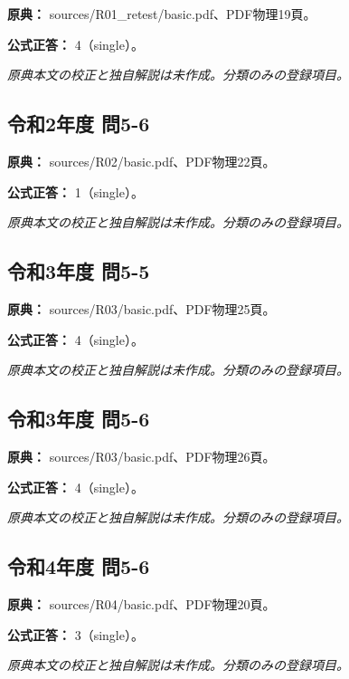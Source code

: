 \noindent\textbf{原典：} sources/R01\_retest/basic.pdf、PDF物理19頁。

\textbf{公式正答：} 4（single）。

\par\textit{原典本文の校正と独自解説は未作成。分類のみの登録項目。}

\subsection{令和2年度 問5-6}
\label{q:r02-reg-basic-5-6}

\noindent\textbf{原典：} sources/R02/basic.pdf、PDF物理22頁。

\textbf{公式正答：} 1（single）。

\par\textit{原典本文の校正と独自解説は未作成。分類のみの登録項目。}

\subsection{令和3年度 問5-5}
\label{q:r03-reg-basic-5-5}

\noindent\textbf{原典：} sources/R03/basic.pdf、PDF物理25頁。

\textbf{公式正答：} 4（single）。

\par\textit{原典本文の校正と独自解説は未作成。分類のみの登録項目。}

\subsection{令和3年度 問5-6}
\label{q:r03-reg-basic-5-6}

\noindent\textbf{原典：} sources/R03/basic.pdf、PDF物理26頁。

\textbf{公式正答：} 4（single）。

\par\textit{原典本文の校正と独自解説は未作成。分類のみの登録項目。}

\subsection{令和4年度 問5-6}
\label{q:r04-reg-basic-5-6}

\noindent\textbf{原典：} sources/R04/basic.pdf、PDF物理20頁。

\textbf{公式正答：} 3（single）。

\par\textit{原典本文の校正と独自解説は未作成。分類のみの登録項目。}


